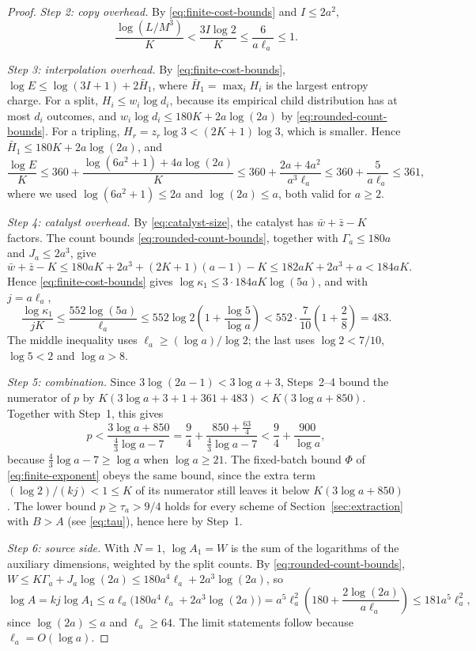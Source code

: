 \begin{proof}
\emph{Step 2: copy overhead.} By \eqref{eq:finite-cost-bounds} and
\(I\le2a^2\),
\[
 \frac{\log(L/M^3)}{K}<\frac{3I\log2}{K}\le\frac{6}{a\ell_a}\le1.
\]

\emph{Step 3: interpolation overhead.} By \eqref{eq:finite-cost-bounds},
\(\log E\le\log(3I+1)+2\bar H_1\), where \(\bar H_1=\max_iH_i\) is the
largest entropy charge. For a split, \(H_i\le w_i\log d_i\), because its
empirical child distribution has at most \(d_i\) outcomes, and
\(w_i\log d_i\le180K+2a\log(2a)\) by \eqref{eq:rounded-count-bounds}.
For a tripling, \(H_r=z_r\log3<(2K+1)\log3\), which is smaller. Hence
\(\bar H_1\le180K+2a\log(2a)\), and
\[
 \frac{\log E}{K}
 \le360+\frac{\log(6a^2+1)+4a\log(2a)}{K}
 \le360+\frac{2a+4a^2}{a^3\ell_a}
 \le360+\frac{5}{a\ell_a}\le361,
\]
where we used \(\log(6a^2+1)\le2a\) and \(\log(2a)\le a\), both valid
for \(a\ge2\).

\emph{Step 4: catalyst overhead.} By \eqref{eq:catalyst-size}, the
catalyst has \(\bar w+\bar z-K\) factors. The count bounds
\eqref{eq:rounded-count-bounds}, together with \(\Gamma_a\le180a\) and
\(J_a\le2a^3\), give
\[
 \bar w+\bar z-K\le180aK+2a^3+(2K+1)(a-1)-K
 \le182aK+2a^3+a<184aK.
\]
Hence \eqref{eq:finite-cost-bounds} gives
\(\log\kappa_1\le3\cdot184aK\log(5a)\), and with \(j=a\ell_a\),
\[
 \frac{\log\kappa_1}{jK}
 \le\frac{552\log(5a)}{\ell_a}
 \le552\log2\left(1+\frac{\log5}{\log a}\right)
 <552\cdot\frac7{10}\left(1+\frac28\right)=483.
\]
The middle inequality uses \(\ell_a\ge(\log a)/\log2\); the last uses
\(\log2<7/10\), \(\log5<2\) and \(\log a>8\).

\emph{Step 5: combination.} Since \(3\log(2a-1)<3\log a+3\), Steps~2--4
bound the numerator of \(p\) by
\(K(3\log a+3+1+361+483)<K(3\log a+850)\). Together with Step~1, this
gives
\[
 p<\frac{3\log a+850}{\frac43\log a-7}
 =\frac94+\frac{850+\frac{63}4}{\frac43\log a-7}
 <\frac94+\frac{900}{\log a},
\]
because \(\frac43\log a-7\ge\log a\) when \(\log a\ge21\). The
fixed-batch bound \(\Phi\) of \eqref{eq:finite-exponent} obeys the same
bound, since the extra term \((\log2)/(kj)<1\le K\) of its numerator
still leaves it below \(K(3\log a+850)\). The lower bound
\(p\ge\tau_a>9/4\) holds for every scheme of
Section~\ref{sec:extraction} with \(B>A\) (see \eqref{eq:tau}), hence
here by Step~1.

\emph{Step 6: source side.} With \(N=1\), \(\log A_1=W\) is the sum of
the logarithms of the auxiliary dimensions, weighted by the split
counts. By \eqref{eq:rounded-count-bounds},
\(W\le K\Gamma_a+J_a\log(2a)\le180a^4\ell_a+2a^3\log(2a)\), so
\[
 \log A=kj\log A_1
 \le a\ell_a\bigl(180a^4\ell_a+2a^3\log(2a)\bigr)
 =a^5\ell_a^2\left(180+\frac{2\log(2a)}{a\ell_a}\right)
 \le181a^5\ell_a^2,
\]
since \(\log(2a)\le a\) and \(\ell_a\ge64\). The limit statements follow
because \(\ell_a=O(\log a)\).
\end{proof}

